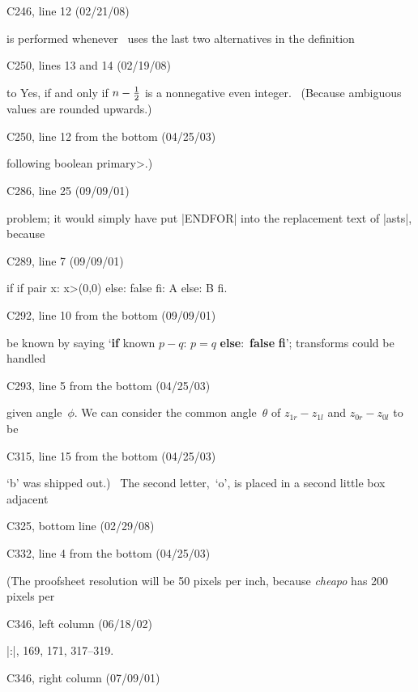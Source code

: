 {{\bugonpage C246, line 12 (02/21/08)

\ninepoint\noindent
is performed whenever \MF\ uses the last two alternatives
in the definition\cutpar

\bugonpage C250, lines 13 and 14 (02/19/08)

\ninepoint\noindent\hbox to\parindent{\bf\hss19.3.\enspace}%
Yes, if and only if $n-{1\over2}$ is a nonnegative even integer.
\ (Because ambiguous values are rounded upwards.)

\bugonpage C250, line 12 from the bottom (04/25/03)

\ninepoint\noindent
following \<boolean primary>.)

\bugonpage C286, line 25 (09/09/01)

\ninepoint\noindent
problem; it would simply have put |ENDFOR| into the
replacement text of |asts|, because\cutpar

\bugonpage C289, line 7 (09/09/01)

\vskip-6pt\ninepoint\begintt
if if pair x: x>(0,0) else: false fi: A else: B fi.
\endtt

\bugonpage C292, line 10 from the bottom (09/09/01)

\ninepoint\noindent
be known by saying `{\bf if\/} known $p-q$: $p=q$ {\bf else}:~{\bf false}
{\bf fi}'; transforms could be handled\cutpar

\bugonpage C293, line 5 from the bottom (04/25/03)

\ninepoint\noindent
given angle~$\phi$. We can consider
the common angle~$\theta$ of $z_{1r}-z_{1l}$ and $z_{0r}-z_{0l}$ to be\cutpar

\bugonpage C315, line 15 from the bottom (04/25/03)

\ninepoint\noindent
`b' was shipped out.) \ The second letter,~`o', is placed
in a second little box adjacent\cutpar

\bugonpage C325, bottom line (02/29/08)


\bugonpage C332, line 4 from the bottom (04/25/03)

\ninepoint\noindent
(The proofsheet resolution will be 50 pixels per inch, because {\it cheapo\/}
has 200 pixels per\cutpar

\bugonpage C346, left column (06/18/02)

\eightpoint\noindent
\llap{*}|:|, 169, 171, 317--319.

\bugonpage C346, right column (07/09/01)

}}
